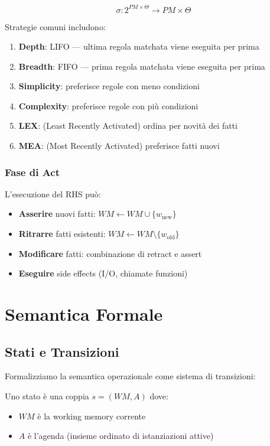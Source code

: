 \begin{equation}
\sigma: 2^{PM \times \Theta} \to PM \times \Theta
\end{equation}

Strategie comuni includono:

\begin{enumerate}
\item \textbf{Depth}: LIFO --- ultima regola matchata viene eseguita per prima
\item \textbf{Breadth}: FIFO --- prima regola matchata viene eseguita per prima  
\item \textbf{Simplicity}: preferisce regole con meno condizioni
\item \textbf{Complexity}: preferisce regole con più condizioni
\item \textbf{LEX}: (Least Recently Activated) ordina per novità dei fatti
\item \textbf{MEA}: (Most Recently Activated) preferisce fatti nuovi
\end{enumerate}

\subsubsection{Fase di Act}

L'esecuzione del RHS può:

\begin{itemize}
\item \textbf{Asserire} nuovi fatti: $WM \gets WM \cup \{w_{\text{new}}\}$
\item \textbf{Ritrarre} fatti esistenti: $WM \gets WM \setminus \{w_{\text{old}}\}$
\item \textbf{Modificare} fatti: combinazione di retract e assert
\item \textbf{Eseguire} side effects (I/O, chiamate funzioni)
\end{itemize}

\section{Semantica Formale}

\subsection{Stati e Transizioni}

Formalizziamo la semantica operazionale come sistema di transizioni:

\begin{definizione}
Uno stato è una coppia $s = (WM, A)$ dove:
\begin{itemize}
\item $WM$ è la working memory corrente
\item $A$ è l'agenda (insieme ordinato di istanziazioni attive)
\end{itemize}
\end{definizione}

